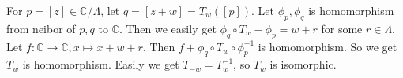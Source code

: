 \documentclass{ctexart}
\begin{document}
\begin{solution}
  For \(p=[z]\in \mathbb{C} / \Lambda\), let \(q=[z+w]=T_w([p])\). 
  Let \(\phi_p,\phi_q\) is homomorphism from neibor of \(p,q\) to \(\mathbb{C}\). Then we easily get \(\phi_q \circ T_w-\phi_p=w+r\) for some \(r \in \Lambda\). 
  Let \(f:\mathbb{C} \to \mathbb{C},x \mapsto x+w+r\). Then \(f+\phi_q \circ T_w \circ \phi_p^{-1}\) is homomorphism. 
  So we get \(T_w\) is homomorphism. 
  Easily we get \(T_{-w}=T_w^{-1}\), so \(T_w\) is isomorphic. 
\end{solution}
\end{document}
